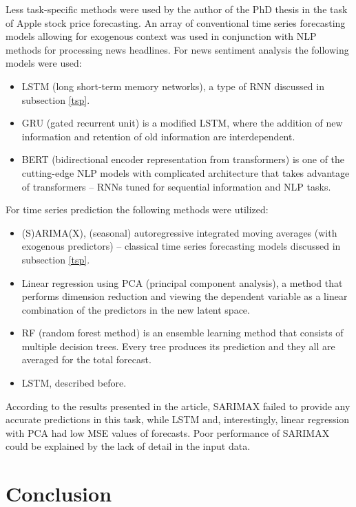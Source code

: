\documentclass[3p,times,procedia]{elsarticle}
\begin{document}
Less task-specific methods were used by the author of the PhD thesis \cite{jeong2022predicting} in the task of Apple stock price forecasting. An array of conventional time series forecasting models allowing for exogenous context was used in conjunction with NLP methods for processing news headlines. For news sentiment analysis the following models were used:
\begin{itemize}
	\item LSTM (long short-term memory networks), a type of RNN discussed in subsection \ref{tsp}.
	\item GRU (gated recurrent unit) is a modified LSTM, where the addition of new information and retention of old information are interdependent.
	\item BERT (bidirectional encoder representation from transformers) is one of the cutting-edge NLP models with complicated architecture that takes advantage of transformers -- RNNs tuned for sequential information and NLP tasks.
\end{itemize}

For time series prediction the following methods were utilized:
\begin{itemize}
	\item (S)ARIMA(X), (seasonal) autoregressive integrated moving averages (with exogenous predictors) -- classical time series forecasting models discussed in subsection \ref{tsp}.
	\item Linear regression using PCA (principal component analysis), a method that performs dimension reduction and viewing the dependent variable as a linear combination of the predictors in the new latent space. 
	\item RF (random forest method) is an ensemble learning method that consists of multiple decision trees. Every tree produces its prediction and they all are averaged for the total forecast. 
	\item LSTM, described before.
\end{itemize}

According to the results presented in the article, SARIMAX failed to provide any accurate predictions in this task, while LSTM and, interestingly, linear regression with PCA had low MSE values of forecasts. Poor performance of SARIMAX could be explained by the lack of detail in the input data.

\section{Conclusion}
\end{document}
